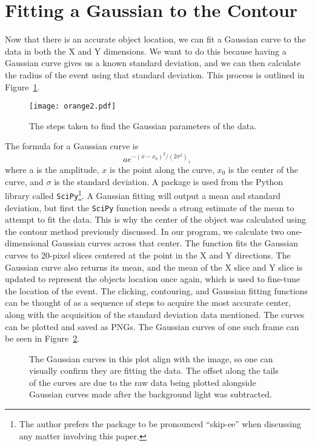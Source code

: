 \section{Fitting a Gaussian to the Contour}
Now that there is an accurate object location, we can fit a Gaussian curve to the data in both the X and Y dimensions. We want to do this because having a Gaussian curve gives us a known standard deviation, and we can then calculate the radius of the event using that standard deviation. This process is outlined in Figure~\ref{fig:gaussianfinder}.

\begin{figure}[h!]
	\centering
	\texttt{[image: orange2.pdf]}
	\caption{The steps taken to find the Gaussian parameters of the data.}
	\label{fig:gaussianfinder}
\end{figure}

The formula for a Gaussian curve is 
\begin{equation}
	ae^{-(x-x_0)^2/(2\sigma^2)},
\end{equation}
where a is the amplitude, $x$ is the point along the curve, $x_0$ is the center of the curve, and $\sigma$ is the standard deviation. A package is used from the Python library called \texttt{SciPy}\footnote{The author prefers the package to be pronounced ``skip-ee'' when discussing any matter involving this paper.}. A Gaussian fitting will output a mean and standard deviation, but first the \texttt{SciPy} function needs a strong estimate of the mean to attempt to fit the data. This is why the center of the object was calculated using the contour method previously discussed. In our program, we calculate two one-dimensional Gaussian curves across that center. The function fits the Gaussian curves to 20-pixel slices centered at the point in the X and Y directions. The Gaussian curve also returns its mean, and the mean of the X slice and Y slice is updated to represent the objects location once again, which is used to fine-tune the location of the event. The clicking, contouring, and Gaussian fitting functions can be thought of as a sequence of steps to acquire the most accurate center, along with the acquisition of the standard deviation data mentioned. The curves can be plotted and saved as PNGs. The Gaussian curves of one such frame can be seen in Figure~\ref{fig:testplot}.

\begin{figure}[h!]
	\centering
	\caption{The Gaussian curves in this plot align with the image, so one can visually confirm they are fitting the data. The offset along the tails of the curves are due to the raw data being plotted alongside Gaussian curves made after the background light was subtracted.}
	\label{fig:testplot}
\end{figure}


